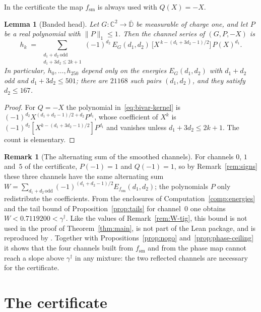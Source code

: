 \documentclass[11pt,reqno]{amsart}
\newtheorem{lemma}[theorem]{Lemma}
\theoremstyle{definition}
\newtheorem{remark}[theorem]{Remark}
\numberwithin{equation}{section}
\newcommand{\C}{\mathbb{C}}
\newcommand{\D}{\mathbb{D}}
\newcommand{\gd}{\gamma^\dagger}
\newcommand{\lone}[1]{\|#1\|_1}
\newcommand{\fsm}{f_{\mathrm{sm}}}
\begin{document}
In the certificate the map $\fsm$ is always used with $Q(X)=-X$.

\begin{lemma}[Banded head]\label{lem:banded}
Let $G:\C^2\to\overline{\D}$ be measurable of charge one, and let $P$ be a real polynomial with $\lone{P}\le1$. Then the channel series of $(G,P,-X)$ is
\begin{equation}\label{eq:banded}
  h_k\;=\;\sum_{\substack{d_1+d_2\ \mathrm{odd}\\ d_1+3d_2\le 2k+1}}(-1)^{d_2}\,E_G(d_1,d_2)\ \bigl[X^{\,k-(d_1+3d_2-1)/2}\bigr]\,P(X)^{d_1}.
\end{equation}
In particular, $h_0,\dots,h_{250}$ depend only on the energies $E_G(d_1,d_2)$ with $d_1+d_2$ odd and $d_1+3d_2\le501$; there are $21168$ such pairs $(d_1,d_2)$, and they satisfy $d_2\le167$.
\end{lemma}

\begin{proof}
For $Q=-X$ the polynomial in~\eqref{eq:bivar-kernel} is $(-1)^{d_2}X^{(d_1+d_2-1)/2+d_2}P^{d_1}$, whose coefficient of $X^k$ is $(-1)^{d_2}[X^{k-(d_1+3d_2-1)/2}]P^{d_1}$ and vanishes unless $d_1+3d_2\le2k+1$. The count is elementary.
\end{proof}

\begin{remark}[The alternating sum of the smoothed channels]\label{rem:W-sm}
For channels $0$, $1$ and~$5$ of the certificate, $P(-1)=1$ and $Q(-1)=1$, so by Remark~\ref{rem:signs} these three channels have the same alternating sum $W=\sum_{d_1+d_2\,\mathrm{odd}}(-1)^{(d_1+d_2-1)/2}E_{\fsm}(d_1,d_2)$; the polynomials $P$ only redistribute the coefficients. From the enclosures of Computation~\ref{comp:energies} and the tail bound of Proposition~\ref{prop:tails} for channel~$0$ one obtains $W<0.7119200<\gd$. Like the values of Remark~\ref{rem:W-tig}, this bound is not used in the proof of Theorem~\ref{thm:main}, is not part of the Lean package, and is reproduced by . Together with Propositions~\ref{prop:nogo} and~\ref{prop:phase-ceiling} it shows that the four channels built from $\fsm$ and from the phase map cannot reach a slope above $\gd$ in any mixture: the two reflected channels are necessary for the certificate.
\end{remark}

\section{The certificate}\label{sec:cert}
\end{document}
